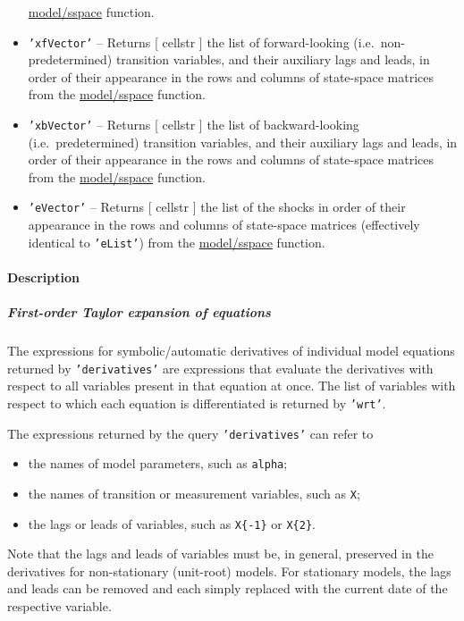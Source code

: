 \begin{itemize}
   \url{model/sspace} function.
 \item
   \texttt{'xfVector'} -- Returns {[} cellstr {]} the list of
   forward-looking (i.e.~non-predetermined) transition variables, and
   their auxiliary lags and leads, in order of their appearance in the
   rows and columns of state-space matrices from the \url{model/sspace}
   function.
 \item
   \texttt{'xbVector'} -- Returns {[} cellstr {]} the list of
   backward-looking (i.e.~predetermined) transition variables, and their
   auxiliary lags and leads, in order of their appearance in the rows and
   columns of state-space matrices from the \url{model/sspace} function.
 \item
   \texttt{'eVector'} -- Returns {[} cellstr {]} the list of the shocks
   in order of their appearance in the rows and columns of state-space
   matrices (effectively identical to \texttt{'eList'}) from the
   \url{model/sspace} function.
 \end{itemize}
 
 \paragraph{Description}
 
 \subparagraph{First-order Taylor expansion of equations}
 
 The expressions for symbolic/automatic derivatives of individual model
 equations returned by \texttt{'derivatives'} are expressions that
 evaluate the derivatives with respect to all variables present in that
 equation at once. The list of variables with respect to which each
 equation is differentiated is returned by \texttt{'wrt'}.
 
 The expressions returned by the query \texttt{'derivatives'} can refer
 to
 
 \begin{itemize}
 \item
   the names of model parameters, such as \texttt{alpha};
 \item
   the names of transition or measurement variables, such as \texttt{X};
 \item
   the lags or leads of variables, such as \texttt{X\{-1\}} or
   \texttt{X\{2\}}.
 \end{itemize}
 
 Note that the lags and leads of variables must be, in general, preserved
 in the derivatives for non-stationary (unit-root) models. For stationary
 models, the lags and leads can be removed and each simply replaced with
 the current date of the respective variable.
 
